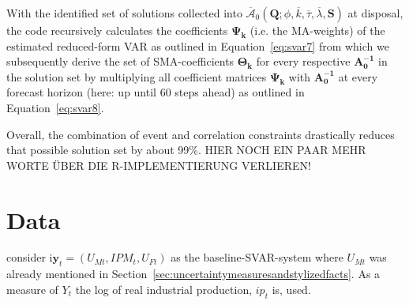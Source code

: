 \documentclass[a4paper,11pt,listof=nochaptergap,oneside,pointednumbers,bibtotoc,bigheadings,liststotoc,hidelinks]{scrbook}
\theoremstyle{mysatz}
\theoremstyle{mydefinition}
\theoremstyle{mytheorem}
\theoremstyle{mybemerkung}
\newcommand{\vect}[1]{\boldsymbol{\mathbf{#1}}}
\begin{document}
With the identified set of solutions collected into $\overline{\vect{\mathcal{A}}}_0(\vect{Q}; \phi, \overline{k}, \overline{\tau}, \overline{\lambda}, \vect{S})$ at disposal, the code recursively calculates the coefficients $\vect{\Psi_k}$ (i.e. the MA-weights) of the estimated reduced-form VAR as outlined in Equation~\ref{eq:svar7} from which we subsequently derive the set of SMA-coefficients $\vect{\Theta_k}$ for every respective $\vect{A_{0}^{-1}}$ in the solution set by multiplying all coefficient matrices $\vect{\Psi_k}$ with $\vect{A_{0}^{-1}}$ at every forecast horizon (here: up until 60 steps ahead) as outlined in Equation~\ref{eq:svar8}.

Overall, the combination of event and correlation constraints drastically reduces that possible solution set by about 99\%. HIER NOCH EIN PAAR MEHR WORTE ÜBER DIE R-IMPLEMENTIERUNG VERLIEREN!


\chapter{Data}
\label{sec:Data}

\citet{ludvigsonetal:18} consider i$\vect{y}_t = (U_{Mt}, IPM_{t}, U_{Ft})$ as the baseline-SVAR-system where $U_{Mt}$ was already mentioned in Section~\ref{sec:uncertaintymeasuresandstylizedfacts}. As a measure of $Y_t$ the log of real industrial production, $ip_t$ is, used. \\
\end{document}
